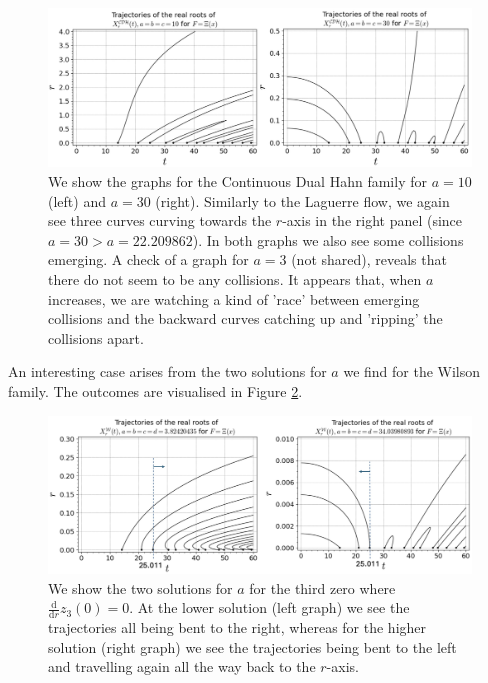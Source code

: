 \documentclass[a4paper,11pt,twoside]{amsart}
\begin{document}
\begin{figure}[H]
  \includegraphics[width=0.9\linewidth]{ContDualHahncolls.jpg}
  \caption{We show the graphs for the Continuous Dual Hahn family for $a=10$ (left) and $a=30$ (right). Similarly to the Laguerre flow, we again see three curves curving towards the $r$-axis in the right panel (since $a=30 > a=22.209862$). In both graphs we also see some collisions emerging. A check of a graph for $a=3$ (not shared), reveals that there do not seem to be any collisions. It appears that, when $a$ increases, we are watching a kind of 'race' between emerging collisions and the backward curves catching up and 'ripping' the collisions apart.}
  \label{fig:ContHahnCurved}
\end{figure}

An interesting case arises from the two solutions for $a$ we find for the Wilson family. The outcomes are visualised in Figure \ref{fig:WilsonCurved}.

\begin{figure}[H]
  \includegraphics[width=0.9\linewidth]{WilsonCurveDouble.jpg}
  \caption{We show the two solutions for $a$ for the third zero where $\frac{\mathrm{d}}{\mathrm{d} r} z_3(0) = 0$. At the lower solution (left graph) we see the trajectories all being bent to the right, whereas for the higher solution (right graph) we see the trajectories being bent to the left and travelling again all the way back to the $r$-axis.}
  \label{fig:WilsonCurved}
\end{figure}
\end{document}
